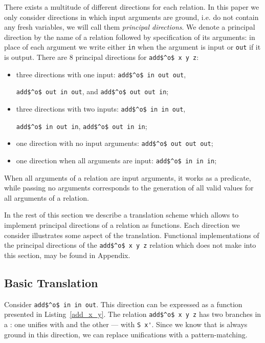 There exists a multitude of different directions for each relation.
In this paper we only consider directions in which input arguments are ground, i.e. do not contain any fresh variables, we will call them \emph{principal directions}.
We denote a principal direction by the name of a relation followed by specification of its arguments: in place of each argument we write either \lstinline{in} when the argument is input or \lstinline{out} if it is output.
There are $8$ principal directions for \lstinline{add$^o$ x y z}:
\begin{itemize}
  \item three directions with one input: \lstinline{add$^o$ in out out},

  \lstinline{add$^o$ out in out}, and \lstinline{add$^o$ out out in};
  \item three directions with two inputs: \lstinline{add$^o$ in in out},

  \lstinline{add$^o$ in out in}, \lstinline{add$^o$ out in in};
  \item one direction with no input arguments:
  \lstinline{add$^o$ out out out};
  \item one direction when all arguments are input:
  \lstinline{add$^o$ in in in};
\end{itemize}
When all arguments of a relation are input arguments, it works as a predicate, while passing no arguments corresponds to the generation of all valid values for all arguments of a relation.

In the rest of this section we describe a translation scheme which allows to implement principal directions of a relation as functions.
Each direction we consider illustrates some aspect of the translation.
Functional implementations of the principal directions of the \lstinline{add$^o$ x y z} relation which does not make into this section, may be found in Appendix.

\subsection{Basic Translation}

Consider \lstinline{add$^o$ in in out}.
This direction can be expressed as a function presented in Listing~\ref{add_x_y}.
The relation \lstinline{add$^o$ x y z} has two branches in a \conde: one unifies \x with \zero and the other --- with \lstinline{S x'}.
Since we know that \x is always ground in this direction, we can replace unifications with a pattern-matching.

